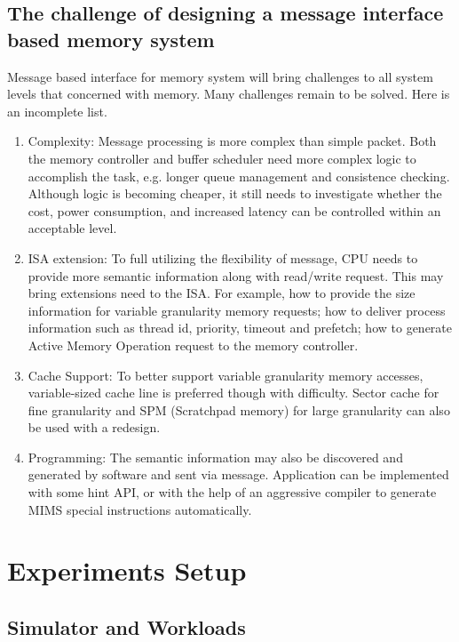 \documentclass[pageno]{jpaper}
\begin{document}
\subsection {The challenge of designing a message interface based memory system}

Message based interface for memory system will bring challenges to all system levels that concerned with memory. Many challenges remain to be solved. Here is an incomplete list.
\begin{enumerate}
\item Complexity: Message processing is more complex than simple packet. Both the memory controller and buffer scheduler need more complex logic to accomplish the task, e.g. longer queue management and consistence checking. Although logic is becoming cheaper, it still needs to investigate whether the cost, power consumption, and increased latency can be controlled within an acceptable level.
\item ISA extension:  To full utilizing the flexibility of message, CPU needs to provide more semantic information along with read/write request. This may bring extensions need to the ISA. For example, how to provide the size information for variable granularity memory requests; how to deliver process information such as thread id, priority, timeout and prefetch; how to generate Active Memory Operation request to the memory controller.
\item Cache Support: To better support variable granularity memory accesses, variable-sized cache line is preferred though with difficulty. Sector cache for fine granularity and SPM (Scratchpad memory) for large granularity can also be used with a redesign.
\item  Programming: The semantic information may also be discovered and generated by software and sent via message. Application can be implemented with some hint API, or with the help of an aggressive compiler to generate MIMS special instructions automatically.
\end{enumerate}


\section{Experiments Setup}

\subsection{Simulator and Workloads}
\end{document}
